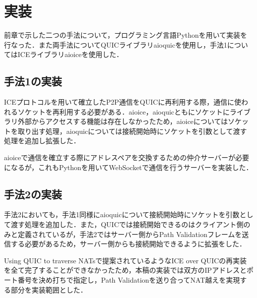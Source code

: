 \section{実装}
前章で示した二つの手法について，プログラミング言語Pythonを用いて実装を行なった．また両手法についてQUICライブラリaioquic\cite{aioquic}を使用し，手法1についてはICEライブラリaioice\cite{aioice}を使用した．
\subsection{手法1の実装}
ICEプロトコルを用いて確立したP2P通信をQUICに再利用する際，通信に使われるソケットを再利用する必要がある．aioice，aioquicともにソケットにライブラリ外部からアクセスする機能は存在しなかったため，aioiceについてはソケットを取り出す処理，aioquicについては接続開始時にソケットを引数として渡す処理を追加し拡張した．

aioiceで通信を確立する際にアドレスペアを交換するための仲介サーバーが必要になるが，これもPythonを用いてWebSocketで通信を行うサーバーを実装した．

\subsection{手法2の実装}
手法2においても，手法1同様にaioquicについて接続開始時にソケットを引数として渡す処理を追加した．また，QUICでは接続開始できるのはクライアント側のみと定義されているが，手法2ではサーバー側からPath Validationフレームを送信する必要があるため，サーバー側からも接続開始できるように拡張をした．

Using QUIC to traverse NATsで提案されているようなICE over QUICの再実装を全て完了することができなかったため，本稿の実装では双方のIPアドレスとポート番号を決め打ちで指定し，Path Validationを送り合ってNAT越えを実現する部分を実装範囲とした．
